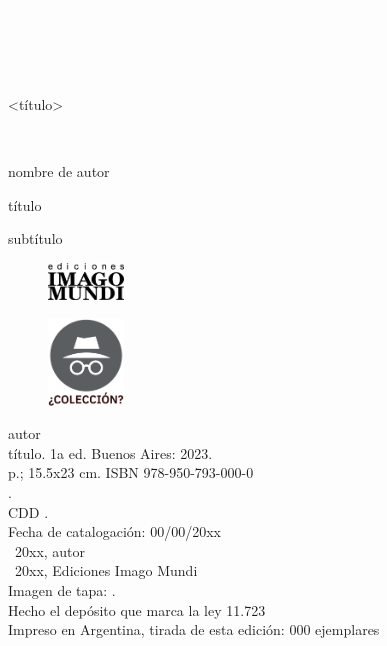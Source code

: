 \newpage
\thispagestyle{empty}
{\textcolor{white}{.}}

\newpage
\thispagestyle{empty}
{\textcolor{white}{.}}

\newpage
\thispagestyle{empty}
{\textcolor{white}{.}}

\vspace{30mm}

\begin{center}
	\LARGE{<título>}
\end{center}

\newpage
\thispagestyle{empty}
{\textcolor{white}{.}}

\newpage
\thispagestyle{empty}
\begin{center}%
{\sc\large{nombre de autor}}\\ %
\end{center}

\vspace{30mm}

\begin{center}
\LARGE{título}\\\vspace{10mm}

\Large{subtítulo}
\end{center}

\vfill

\begin{figure}[b]
\centering
\includegraphics[width=20mm]{./media/logo-imago-ByW.png}
\end{figure}

\newpage
\thispagestyle{empty}
\begin{figure}[t]
\centering
\vspace{-10mm}
\includegraphics[width=20mm]{./media/desconocido.png}\\
\end{figure}

\noindent autor \\
\noindent título. 1a ed. Buenos Aires: 2023.\\
 p.; 15.5x23 cm. ISBN 978-950-793-000-0 \\
. \\
\noindent CDD .\\
\noindent Fecha de catalogación: 00/00/20xx \\
\noindent \textcopyright~20xx, autor \\
\noindent \textcopyright~20xx, Ediciones Imago Mundi\\
\noindent Imagen de tapa: .\\
\noindent Hecho el depósito que marca la ley 11.723\\
\noindent Impreso en Argentina, tirada de esta edición: 000 ejemplares\\

